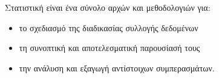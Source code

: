 Στατιστική είναι ένα σύνολο αρχών και μεθοδολογιών για:
\begin{itemize}
\item το σχεδιασμό της διαδικασίας συλλογής δεδομένων
\item τη συνοπτική και αποτελεσματική παρουσίασή τους
\item την ανάλυση και εξαγωγή αντίστοιχων συμπερασμάτων.
\end{itemize}
